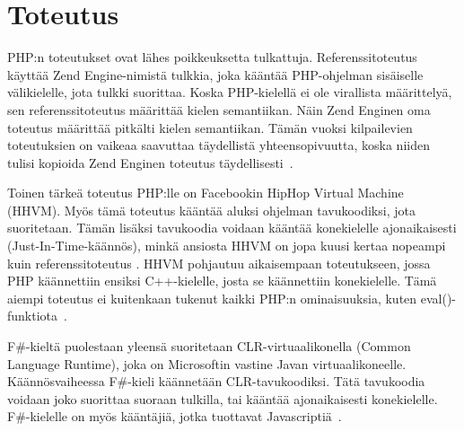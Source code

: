 \section{Toteutus}
PHP:n toteutukset ovat lähes poikkeuksetta tulkattuja. Referenssitoteutus  käyttää Zend Engine-nimistä tulkkia, joka kääntää PHP-ohjelman sisäiselle välikielelle, jota tulkki suorittaa. Koska PHP-kielellä ei ole virallista määrittelyä, sen referenssitoteutus määrittää kielen semantiikan. Näin Zend Enginen oma toteutus määrittää pitkälti kielen semantiikan. Tämän vuoksi kilpailevien toteutuksien on vaikeaa saavuttaa täydellistä yhteensopivuutta, koska niiden tulisi kopioida Zend Enginen toteutus täydellisesti~\cite{wiki_php}.

Toinen tärkeä toteutus PHP:lle on Facebookin HipHop Virtual Machine (HHVM). Myös tämä toteutus kääntää aluksi ohjelman tavukoodiksi, jota suoritetaan. Tämän lisäksi tavukoodia voidaan kääntää konekielelle ajonaikaisesti (Just-In-Time-käännös), minkä ansiosta HHVM on jopa kuusi kertaa nopeampi kuin referenssitoteutus \cite{wiki_hiphop}. HHVM pohjautuu aikaisempaan toteutukseen, jossa PHP käännettiin ensiksi C++-kielelle, josta se käännettiin konekielelle. Tämä aiempi toteutus ei kuitenkaan tukenut kaikki PHP:n ominaisuuksia, kuten eval()-funktiota~\cite{wiki_hiphop}.

F\#-kieltä puolestaan yleensä suoritetaan CLR-virtuaalikonella (Common Language Runtime), joka on Microsoftin vastine Javan virtuaalikoneelle. Käännösvaiheessa F\#-kieli käännetään CLR-tavukoodiksi. Tätä tavukoodia voidaan joko suorittaa suoraan tulkilla, tai kääntää ajonaikaisesti konekielelle. F\#-kielelle on myös kääntäjiä, jotka tuottavat Javascriptiä~\cite{wiki_fs_programming}.